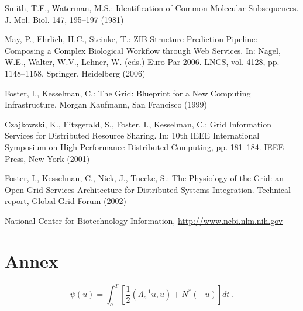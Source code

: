 \documentclass[runningheads,a4paper]{llncs}
\begin{document}
\begin{thebibliography}{4}

 Smith, T.F., Waterman, M.S.: Identification of Common Molecular
Subsequences. J. Mol. Biol. 147, 195--197 (1981)

 May, P., Ehrlich, H.C., Steinke, T.: ZIB Structure Prediction Pipeline:
Composing a Complex Biological Workflow through Web Services. In: Nagel,
W.E., Walter, W.V., Lehner, W. (eds.) Euro-Par 2006. LNCS, vol. 4128,
pp. 1148--1158. Springer, Heidelberg (2006)

 Foster, I., Kesselman, C.: The Grid: Blueprint for a New Computing
Infrastructure. Morgan Kaufmann, San Francisco (1999)

 Czajkowski, K., Fitzgerald, S., Foster, I., Kesselman, C.: Grid
Information Services for Distributed Resource Sharing. In: 10th IEEE
International Symposium on High Performance Distributed Computing, pp.
181--184. IEEE Press, New York (2001)

 Foster, I., Kesselman, C., Nick, J., Tuecke, S.: The Physiology of the
Grid: an Open Grid Services Architecture for Distributed Systems
Integration. Technical report, Global Grid Forum (2002)

 National Center for Biotechnology Information, \url{http://www.ncbi.nlm.nih.gov}

\end{thebibliography}


\section{Annex}

\begin{equation}
  \psi (u) = \int_{o}^{T} \left[\frac{1}{2}
  \left(\Lambda_{o}^{-1} u,u\right) + N^{\ast} (-u)\right] dt \;  .
\end{equation}
\end{document}
